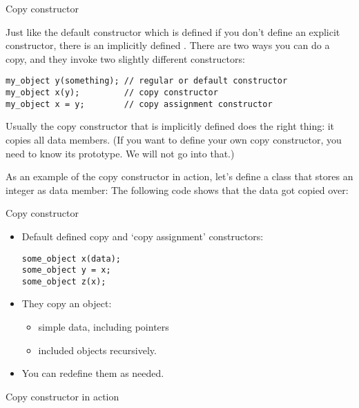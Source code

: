  {Copy constructor}

Just like the default constructor which is defined if you don't define
an explicit constructor, there is an implicitly defined
.
%
There are two ways you can do a copy, and they
invoke two slightly different constructors:
\begin{lstlisting}
my_object y(something); // regular or default constructor
my_object x(y);         // copy constructor
my_object x = y;        // copy assignment constructor
\end{lstlisting}
Usually the copy constructor that is implicitly defined does the right
thing: it copies all data members. (If you want to define your own copy
constructor, you need to know its prototype. We will not go into that.)

As an example of the copy constructor in action,
let's define a class that stores an integer as data member:
%
%
The following code shows that the data got copied over:
%

\begin{slide}{Copy constructor}
  \label{sl:class-copy}
  \begin{multicols}{2}
    \begin{itemize}
    \item  Default defined copy and `copy assignment' constructors:
\begin{lstlisting}
some_object x(data);
some_object y = x;
some_object z(x);
\end{lstlisting}
    \item They copy an object:
      \begin{itemize}
      \item simple data, including pointers
      \item included objects recursively.
      \end{itemize}
    \item You can redefine them as needed.
    \end{itemize}
    \vfill\columnbreak
  \end{multicols}
\end{slide}

\begin{slide}{Copy constructor in action}
  \label{sl:class-copy-out}
\end{slide}

